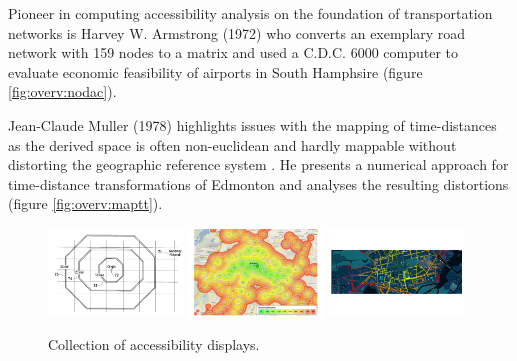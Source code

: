 
    Pioneer in computing accessibility analysis on the foundation of
    transportation networks is Harvey W. Armstrong (1972) who converts an
    exemplary road network with 159 nodes to a matrix and used a C.D.C. 6000
    computer to evaluate economic feasibility of airports in South Hamphsire
    \cite{armstrong1972network} (figure \ref{fig:overv:nodac}).\par

    Jean-Claude Muller (1978) highlights issues with the mapping of
    time-distances as the derived space is often non-euclidean and hardly
    mappable without distorting the geographic reference system
    \cite{muller1978mapping}. He presents a numerical approach for time-distance
    transformations of Edmonton and analyses the resulting distortions (figure
    \ref{fig:overv:maptt}).\par

    \begin{figure}[h]
      {\includegraphics[width=0.32\textwidth]{./img/overv-patnt.png}}
      \hfill
      {\includegraphics[width=0.32\textwidth]{./img/overv-berln.png}}
      \hfill
      {\includegraphics[width=0.32\textwidth]{./img/overv-potsd.png}}
      \caption{Collection of accessibility displays.}
      \label{fig:overv:2}
    \end{figure}

